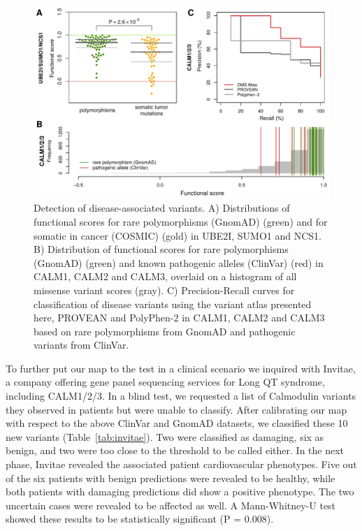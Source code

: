 \begin{figure}[h!]
	\centering
	\includegraphics[width=\textwidth]{img/calm_disease.pdf}
	\caption{Detection of disease-associated variants. A) Distributions of functional scores for rare polymorphisms (GnomAD) (green) and for somatic in cancer (COSMIC) (gold) in UBE2I, SUMO1 and NCS1. B) Distribution of functional scores for rare polymorphisms (GnomAD) (green) and known pathogenic alleles (ClinVar) (red) in CALM1, CALM2 and CALM3, overlaid on a histogram of all missense variant scores (gray). C) Precision-Recall curves for classification of disease variants using the variant atlas presented here, PROVEAN and PolyPhen-2 in CALM1, CALM2 and CALM3 based on rare polymorphisms from GnomAD and pathogenic variants from ClinVar.}
	\label{fig:calm_disease}
\end{figure}


To further put our map to the test in a clinical scenario we inquired with Invitae, a company offering gene panel sequencing services for Long QT syndrome, including CALM1/2/3. In a blind test, we requested a list of Calmodulin variants they observed in patients but were unable to classify. After calibrating our map with respect to the above ClinVar and GnomAD datasets, we classified these 10 new variants (Table~\ref{tab:invitae}). Two were classified as damaging, six as benign, and two were too close to the threshold to be called either. In the next phase, Invitae revealed the associated patient cardiovascular phenotypes. Five out of the six patients with benign predictions were revealed to be healthy, while both patients with damaging predictions did show a positive phenotype. The two uncertain cases were revealed to be affected as well. A Mann-Whitney-U test showed these results to be statistically significant (P = 0.008).

